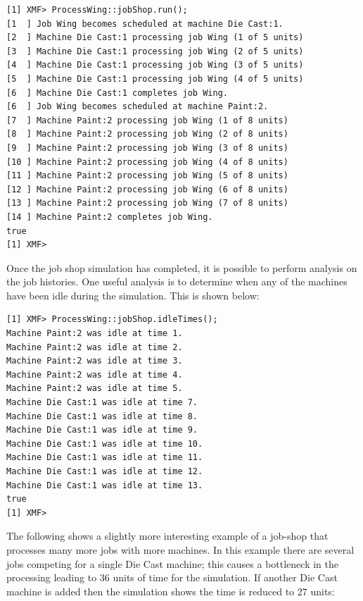 \begin{lstlisting}
[1] XMF> ProcessWing::jobShop.run();
[1  ] Job Wing becomes scheduled at machine Die Cast:1.
[2  ] Machine Die Cast:1 processing job Wing (1 of 5 units)
[3  ] Machine Die Cast:1 processing job Wing (2 of 5 units)
[4  ] Machine Die Cast:1 processing job Wing (3 of 5 units)
[5  ] Machine Die Cast:1 processing job Wing (4 of 5 units)
[6  ] Machine Die Cast:1 completes job Wing.
[6  ] Job Wing becomes scheduled at machine Paint:2.
[7  ] Machine Paint:2 processing job Wing (1 of 8 units)
[8  ] Machine Paint:2 processing job Wing (2 of 8 units)
[9  ] Machine Paint:2 processing job Wing (3 of 8 units)
[10 ] Machine Paint:2 processing job Wing (4 of 8 units)
[11 ] Machine Paint:2 processing job Wing (5 of 8 units)
[12 ] Machine Paint:2 processing job Wing (6 of 8 units)
[13 ] Machine Paint:2 processing job Wing (7 of 8 units)
[14 ] Machine Paint:2 completes job Wing.
true
[1] XMF>
\end{lstlisting}Once the job shop simulation has completed, it is possible to perform
analysis on the job histories. One useful analysis is to determine
when any of the machines have been idle during the simulation. This
is shown below:

\begin{lstlisting}
[1] XMF> ProcessWing::jobShop.idleTimes();
Machine Paint:2 was idle at time 1.
Machine Paint:2 was idle at time 2.
Machine Paint:2 was idle at time 3.
Machine Paint:2 was idle at time 4.
Machine Paint:2 was idle at time 5.
Machine Die Cast:1 was idle at time 7.
Machine Die Cast:1 was idle at time 8.
Machine Die Cast:1 was idle at time 9.
Machine Die Cast:1 was idle at time 10.
Machine Die Cast:1 was idle at time 11.
Machine Die Cast:1 was idle at time 12.
Machine Die Cast:1 was idle at time 13.
true
[1] XMF>
\end{lstlisting}The following shows a slightly more interesting example of a job-shop
that processes many more jobs with more machines. In this example
there are several jobs competing for a single Die Cast machine; this
causes a bottleneck in the processing leading to 36 units of time
for the simulation. If another Die Cast machine is added then the
simulation shows the time is reduced to 27 units:

